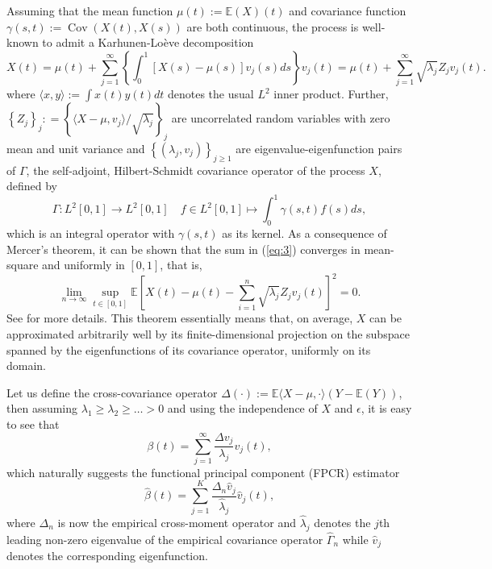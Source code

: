 \documentclass[11pt]{article}
\DeclareMathOperator{\Cov}{Cov}
\begin{document}
Assuming that the mean function $\mu(t) := \mathbb{E}(X)(t)$ and covariance function $\gamma(s,t) := \Cov\left(X(t), X(s) \right)$ are both continuous, the process is well-known to admit a Karhunen-Loève decomposition 
\begin{equation}
\label{eq:3}
X(t) = \mu(t) + \sum_{j=1}^{\infty}  \left\{ \int_{0}^1  \left[ X(s) - \mu(s) \right] v_j(s) ds \right\} v_j(t)  = \mu(t) + \sum_{j=1}^{\infty} \sqrt{\lambda_j }Z_j v_j(t).
\end{equation}
where $\langle x, y \rangle := \int x(t) y(t) dt$ denotes the usual $L^2$ inner product. Further, $\left\{Z _j \right\}_{j} : = \left\{ \langle X - \mu, v_j \rangle /\sqrt{\lambda_j} \right\}_{j}$ are uncorrelated random variables with zero mean and unit variance and $\left\{\left(\lambda_j, v_j \right) \right\}_{j\geq1}$ are eigenvalue-eigenfunction pairs of  $\Gamma$, the self-adjoint, Hilbert-Schmidt covariance operator of the process  $X$, defined by
\vspace{0.1cm}
\begin{equation}
\label{eq:4}
\Gamma : L^2[0,1] \to L^2[0,1]  \quad  f \in L^2[0,1] \mapsto \int_{0}^{1} \gamma(s,t) f(s) ds,
\end{equation}
which is an integral operator with $\gamma(s,t)$ as its kernel. As a consequence of Mercer's theorem, it can be shown that the sum in (\ref{eq:3}) converges in mean-square and uniformly in $\left[0,1\right]$, that is,
\begin{equation}
\label{eq:5}
\lim_{n \to \infty} \sup_{t \in [0,1]} \mathbb{E} \left[ X(t) - \mu(t) -  \sum_{i=1}^n  \sqrt{\lambda_j }Z_j v_j(t) \right]^2 = 0.
\end{equation}
See \cite{hsing2015theoretical} for more details. This theorem essentially means that, on average, $X$ can be approximated arbitrarily well by its finite-dimensional projection on the subspace spanned by the eigenfunctions of its covariance operator, uniformly on its domain.

Let us define the cross-covariance operator $\Delta(\cdot) := \mathbb{E} \langle X-\mu, \cdot \rangle (Y-\mathbb{E}(Y))$, then assuming $\lambda_1 \geq \lambda_2 \geq \ldots >0$ and using the independence of $X$ and $\epsilon$, it is easy to see that 
\begin{equation}
\label{eq:6}
\beta(t)   = \sum_{j=1}^{\infty} \frac{\Delta v_j}{\lambda_j}  v_j(t),
\end{equation}
which naturally suggests the functional principal component (FPCR) estimator 
\begin{equation}
\label{eq:7}
\widehat{\beta}(t) = \sum_{j=1}^K \frac{\Delta_n \widehat{v}_j}{\widehat{\lambda}_j} \widehat{v}_j (t),
\end{equation}
where $\Delta_n$ is now the empirical cross-moment operator and $ \widehat{\lambda}_j$ denotes the $j$th leading non-zero eigenvalue of the empirical covariance operator $\widehat{\Gamma}_n$ while $\widehat{v}_j$ denotes the corresponding eigenfunction. 
\end{document}
